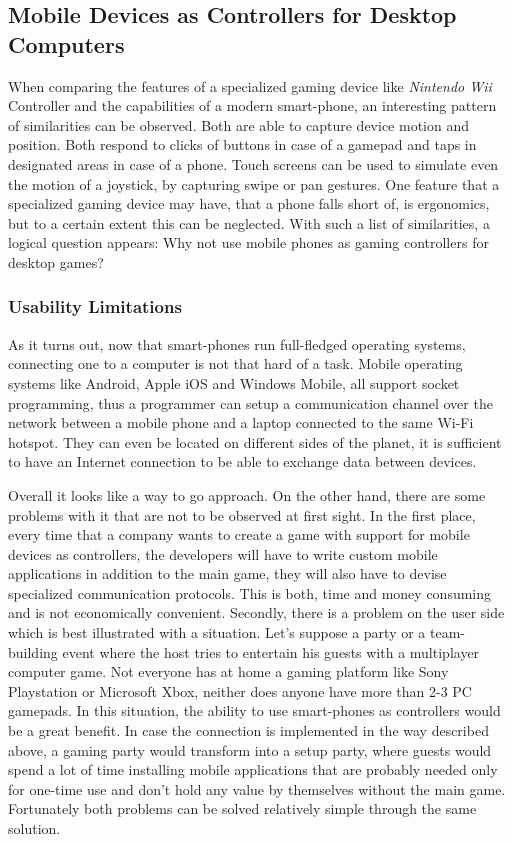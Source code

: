 
\subsection{Mobile Devices as Controllers for Desktop Computers}

When comparing the features of a specialized gaming device like \emph{Nintendo
Wii}\cite{wiimote} Controller and the capabilities of a modern smart-phone, an interesting
pattern of similarities can be observed. Both are able to capture device
motion and position. Both respond to clicks of buttons in case of a gamepad
and taps in designated areas in case of a phone. Touch screens can be used to
simulate even the motion of a joystick, by capturing swipe or pan gestures.
One feature that a specialized gaming device may have, that a phone falls
short of, is ergonomics, but to a certain extent this can be neglected. With
such a list of similarities, a logical question appears: Why not use mobile
phones as gaming controllers for desktop games?


\subsubsection{Usability Limitations}

As it turns out, now that smart-phones run full-fledged operating systems,
connecting one to a computer is not that hard of a task. Mobile operating
systems like Android, Apple iOS and Windows Mobile, all support socket
programming, thus a programmer can setup a communication channel over the
network between a mobile phone and a laptop connected to the same Wi-Fi
hotspot. They can even be located on different sides of the planet, it is
sufficient to have an Internet connection to be able to exchange data between
devices.

Overall it looks like a way to go approach. On the other hand, there are some
problems with it that are not to be observed at first sight. In the first
place, every time that a company wants to create a game with support for
mobile devices as controllers, the developers will have to write custom mobile
applications in addition to the main game, they will also have to devise
specialized communication protocols. This is both, time and money consuming
and is not economically convenient. Secondly, there is a problem on the user
side which is best illustrated with a situation. Let's suppose a party or a
team-building event where the host tries to entertain his guests with a
multiplayer computer game. Not everyone has at home a gaming platform like
Sony Playstation or Microsoft Xbox, neither does anyone have more than 2-3 PC
gamepads. In this situation, the ability to use smart-phones as controllers
would be a great benefit. In case the connection is implemented in the way
described above, a gaming party would transform into a setup party, where
guests would spend a lot of time installing mobile applications that are
probably needed only for one-time use and don't hold any value by themselves
without the main game. Fortunately both problems can be solved relatively
simple through the same solution.

